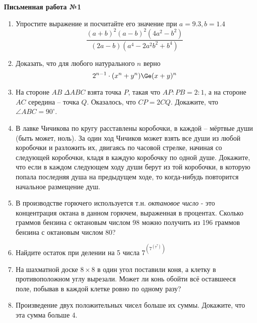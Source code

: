 \documentclass[12pt]{article}
\begin{document}
\centerline{\large \bf Письменная работа №1}
\begin{enumerate}
\item Упростите выражение и посчитайте его значение при $a = 9.3, b = 1.4$
\begin{equation*}
\frac{(a + b)^2(a - b)^2(4a^2 - b^2)}{(2a - b)(a^4 - 2a^2b^2 + b^4)}
\end{equation*}
\item Доказать, что для любого натурального $n$ верно
\begin{equation*}
    2^{n - 1} \cdot (x^n + y^n) \Ge (x + y)^n
\end{equation*}
\item На стороне $AB \; \Delta ABC$ взята точка $P$, такая что $AP : PB = 2 : 1$, а на стороне $AC$
середина -- точка $Q$. Оказалось, что $CP = 2CQ$. Докажите, что $\angle ABC = 90^{\circ}$.


\item В лавке Чичикова по кругу расставлены коробочки, в каждой -- мёртвые души (быть может,
ноль). За один ход Чичиков может взять все души из любой коробочки и разложить их,
двигаясь по часовой стрелке, начиная со следующей коробочки, кладя в каждую коробочку по одной
душе. Докажите, что если в каждом следующем ходу души берут из той коробочки, в которую
попала последняя душа на предыдущем ходе, то когда-нибудь повторится начальное размещение
душ.
\item В производстве горючего используется т.н. {\it октановое число} - это концентрация октана в
данном горючем, выраженная в процентах. Сколько граммов бензина с октановым числом 98 можно получить
из 196 граммов бензина с октановым числом 80?
\item Найдите остаток при делении на 5 числа {\large $7^{\left(7^{(7^{7})}\right)}$}
\item На шахматной доске $8 \times 8$ в один угол поставили коня, а клетку в противоположном углу вырезали.
Может ли конь обойти всё оставшееся поле, побывав в каждой клетке ровно по одному разу?
\item Произведение двух положительных чисел больше их суммы. Докажите, что эта сумма больше 4.
\end{enumerate}
\end{document}
